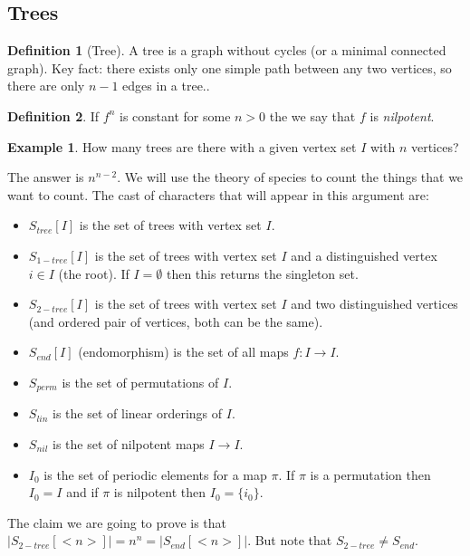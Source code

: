 \documentclass[12pt]{article}
\theoremstyle{definition}
\newtheorem{defn}{Definition}
\newtheorem{exmp}{Example}[section]
\begin{document}
\subsection{Trees}

\begin{defn}[Tree]
    A tree is a graph without cycles (or a minimal connected graph). Key fact:
    there exists only one simple path between any two vertices, so there are
    only $n - 1$ edges in a tree..
\end{defn}

\begin{defn}
    If $f^n$ is constant for some $n>0$ the we say that $f$ is \textit{nilpotent}.
\end{defn}

\begin{exmp}
    How many trees are there with a given vertex set $I$ with $n$ vertices?

    The answer is $n^{n-2}$. We will use the theory of species to count the
    things that we want to count. The cast of characters that will appear in
    this argument are:
    \begin{itemize}
        \item $S_{tree}[I]$ is the set of trees with vertex set $I$.
        \item $S_{1-tree}[I]$ is the set of trees with vertex set $I$ and a
            distinguished vertex $i \in I$ (the root). If $I = \emptyset$ then
            this returns the singleton set.
        \item $S_{2-tree}[I]$ is the set of trees with vertex set $I$ and two
            distinguished vertices (and ordered pair of vertices, both can be
            the same).
        \item $S_{end}[I]$ (endomorphism) is the set of all maps $f: I \rightarrow I$.
        \item $S_{perm}$ is the set of permutations of $I$.
        \item $S_{lin}$ is the set of linear orderings of $I$.
        \item $S_{nil}$ is the set of nilpotent maps $I \rightarrow I$.
        \item $I_0$ is the set of periodic elements for a map $\pi$. If $\pi$
            is a permutation then $I_0 = I$ and if $\pi$ is nilpotent then $I_0
            = \{i_0\}$.
    \end{itemize}

    The claim we are going to prove is that $|S_{2-tree}[<n>]| = n^n =
    |S_{end}[<n>]|$. But note that $S_{2-tree} \ne S_{end}$.
\end{exmp}
\end{document}
